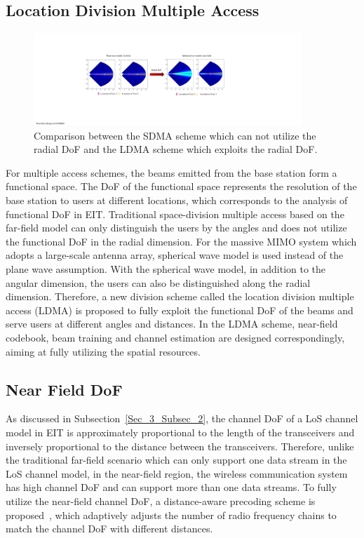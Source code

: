 \documentclass[journal,twocolumn]{IEEEtran}
\begin{document}
\subsection{Location Division Multiple Access}
\begin{figure}
	\centering 
	\includegraphics[width=0.9\textwidth]{figures/LDMA.pdf} 
	\caption{Comparison between the SDMA scheme which can not utilize the radial DoF and the LDMA scheme which exploits the radial DoF. \cite{wu2022multiple} }
	\label{fig:LDMA}
\end{figure}
For multiple access schemes, the beams emitted from the base station form a functional space. The DoF of the functional space represents the resolution of the base station to users at different locations, which corresponds to the analysis of functional DoF in EIT. 
Traditional space-division multiple access based on the far-field model can only distinguish the users by the angles and does not utilize the functional DoF in the radial dimension. 
For the massive MIMO system which adopts a large-scale antenna array, spherical wave model is used instead of the plane wave assumption. 
With the spherical wave model, in addition to the angular dimension, the users can also be distinguished along the radial dimension. 
Therefore, a new division scheme called the location division multiple access (LDMA) is proposed to fully exploit the functional DoF of the beams and serve users at different angles and distances. 
In the LDMA scheme, near-field codebook, beam training and channel estimation are designed correspondingly, aiming at fully utilizing the spatial resources. 

\subsection{Near Field DoF}
As discussed in Subsection~\ref{Sec_3_Subsec_2}, the channel DoF of a LoS channel model in EIT is approximately proportional to the length of the transceivers and inversely proportional to the distance between the transceivers. Therefore, unlike the traditional far-field scenario which can only support one data stream in the LoS channel model, in the near-field region, the wireless communication system has high channel DoF and can support more than one data streams. To fully utilize the near-field channel DoF, a distance-aware precoding scheme is proposed~\cite{wu2022multiple}, which adaptively adjusts the number of radio frequency chains to match the channel DoF with different distances.   
\end{document}
